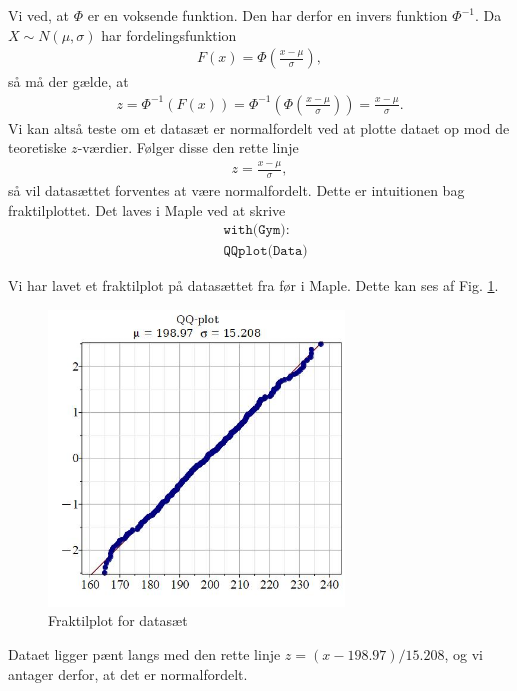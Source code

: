Vi ved, at $\Phi$ er en voksende funktion. Den har derfor en invers funktion $\Phi^{-1}$. Da $X \sim N(\mu,\sigma)$ har fordelingsfunktion
\begin{align*}
	F(x) = \Phi\left(\frac{x-\mu}{\sigma}\right),
\end{align*} 
så må der gælde, at 
\begin{align*}
	z = \Phi^{-1}(F(x)) = \Phi^{-1}\left(\Phi\left(\frac{x-\mu}{\sigma}\right) \right) = \frac{x-\mu}{\sigma}.
\end{align*}
Vi kan altså teste om et datasæt er normalfordelt ved at plotte dataet op mod de teoretiske $z$-værdier. Følger disse den rette linje
\begin{align*}
	z = \frac{x-\mu}{\sigma},
\end{align*}
så vil datasættet forventes at være normalfordelt. Dette er intuitionen bag fraktilplottet. Det laves i Maple ved at skrive
\begin{align*}
	&\texttt{with(Gym):}\\
	&\texttt{QQplot(Data)}
\end{align*}
\begin{exa}
	Vi har lavet et fraktilplot på datasættet fra før i Maple. Dette kan ses af Fig. \ref{fig:QQ}.
	\begin{figure}[H]
		\centering
		\includegraphics[width=0.7\textwidth]{Billeder/QQ.jpg}
		\caption{Fraktilplot for datasæt}
		\label{fig:QQ}
	\end{figure}
	Dataet ligger pænt langs med den rette linje $z = (x-198.97)/15.208$, og vi antager derfor, at det er normalfordelt. 
\end{exa}


